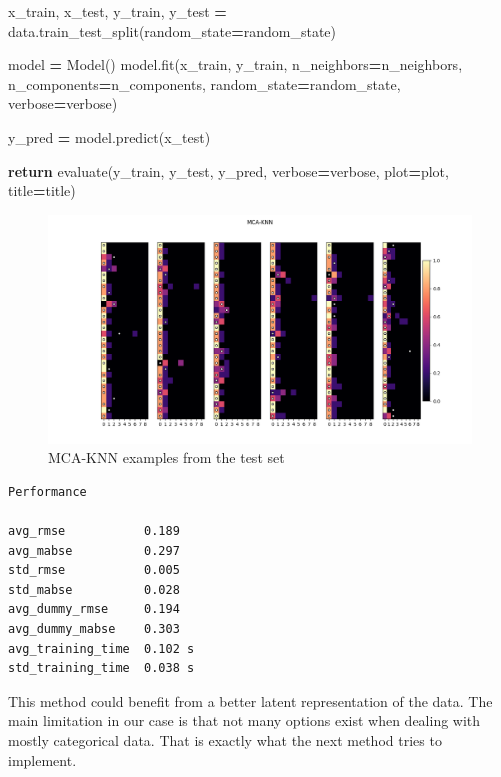 \documentclass[
]{article}
\newenvironment{Shaded}{\begin{snugshade}}{\end{snugshade}}
\newcommand{\ControlFlowTok}[1]{\textcolor[rgb]{0.13,0.29,0.53}{\textbf{#1}}}
\newcommand{\NormalTok}[1]{#1}
\newcommand{\OperatorTok}[1]{\textcolor[rgb]{0.81,0.36,0.00}{\textbf{#1}}}
\begin{document}
\begin{Shaded}
\begin{Highlighting}[]
\NormalTok{    x\_train, x\_test, y\_train, y\_test }\OperatorTok{=}\NormalTok{ data.train\_test\_split(random\_state}\OperatorTok{=}\NormalTok{random\_state)}

\NormalTok{    model }\OperatorTok{=}\NormalTok{ Model()}
\NormalTok{    model.fit(x\_train, y\_train,}
\NormalTok{              n\_neighbors}\OperatorTok{=}\NormalTok{n\_neighbors, n\_components}\OperatorTok{=}\NormalTok{n\_components,}
\NormalTok{              random\_state}\OperatorTok{=}\NormalTok{random\_state, verbose}\OperatorTok{=}\NormalTok{verbose)}

\NormalTok{    y\_pred }\OperatorTok{=}\NormalTok{ model.predict(x\_test)}

    \ControlFlowTok{return}\NormalTok{ evaluate(y\_train, y\_test, y\_pred, verbose}\OperatorTok{=}\NormalTok{verbose, plot}\OperatorTok{=}\NormalTok{plot, title}\OperatorTok{=}\NormalTok{title)}
\end{Highlighting}
\end{Shaded}

\begin{figure}
\centering
\includegraphics{figures/mca_knn.png}
\caption{MCA-KNN examples from the test set}
\end{figure}

\begin{verbatim}
Performance

avg_rmse           0.189
avg_mabse          0.297
std_rmse           0.005
std_mabse          0.028
avg_dummy_rmse     0.194
avg_dummy_mabse    0.303
avg_training_time  0.102 s
std_training_time  0.038 s
\end{verbatim}

This method could benefit from a better latent representation of the
data. The main limitation in our case is that not many options exist
when dealing with mostly categorical data. That is exactly what the next
method tries to implement.
\end{document}
